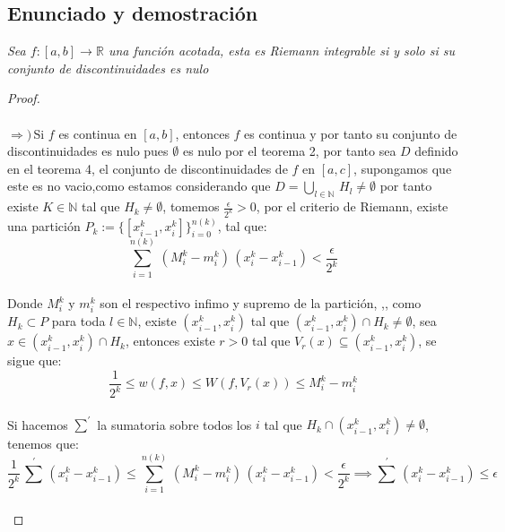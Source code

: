 \documentclass[11pt,letterpaper]{article}
\newcommand{\R}{\mathbb{R}}
\newcommand{\N}{\mathbb{N}}
\begin{document}
\subsection*{Enunciado y demostraci\'on}
\begin{tcolorbox}[
	title = \textcolor{black}{\textcolor{white}{Teorema de integrabilidad de Lebesgue }},]
\textit{Sea $f:[a,b]\rightarrow \R$ una funci\'on acotada, esta es Riemann integrable si y solo si su conjunto de discontinuidades es nulo}
\end{tcolorbox}
\begin{proof}\,\\
    \,\\
    $\Rightarrow)$\,Si $f$ es continua en $[a,b]$, entonces $f$ es continua y por tanto su conjunto de discontinuidades es nulo pues $\emptyset$ es nulo por el teorema 2, por
    tanto sea $D$ definido en el teorema 4, el conjunto de discontinuidades de $f$ en $[a,c]$, supongamos que este es no vacio,como estamos considerando que $D=\bigcup_{l\in \N}\,H_l\neq \emptyset$  por tanto existe $K\in \N$ tal que $H_k\neq \emptyset$, tomemos $\frac{\epsilon}{2^k}>0$, por el criterio de Riemann, existe una partici\'on $P_k:=\{[x^k_{i-1},x^k_{i}]\}_{i=0}^{n(k)}$, tal que:\,\\
    \begin{equation*}
        \sum_{i=1}^{n(k)}\,(M^k_i-m^k_i)\,(x^k_{i}-x^k_{i-1})<\frac{\epsilon}{2^k}
    \end{equation*}\,\\
    Donde $M^k_i$ y $m^k_i$ son el respectivo infimo y supremo de la partici\'on, ,, como $H_k\subset P$ para toda $l\in \N$, existe $(x^k_{i-1},x^k_{i})$ tal que $(x^k_{i-1},x^k_{i})\cap H_k\neq \emptyset$, sea
    $x\in (x^k_{i-1},x^k_{i})\cap H_k$, entonces existe $r>0$ tal que $V_r(x)\subseteq (x^k_{i-1},x^k_{i})$, se sigue que:\,\\
    \begin{equation*}
        \frac{1}{2^k}\leq w(f,x) \leq W(f,V_r(x))\leq M^k_i-m^k_i
    \end{equation*}\,\\
    Si hacemos $\sum^{'}$ la sumatoria sobre todos los $i$ tal que $H_k\cap (x^k_{i-1},x^k_{i})\neq \emptyset$, tenemos que:\,\\
    \begin{equation*}
        \frac{1}{2^k}\,\sum^{'}\,(x^k_{i}-x^k_{i-1})\leq \sum_{i=1}^{n(k)}\,(M^k_i-m^k_i)\,(x^k_{i}-x^k_{i-1})<\frac{\epsilon}{2^k}\implies \sum^{'}\,(x^k_{i}-x^k_{i-1})\leq \epsilon
    \end{equation*}\,\\

\end{proof}
\end{document}
